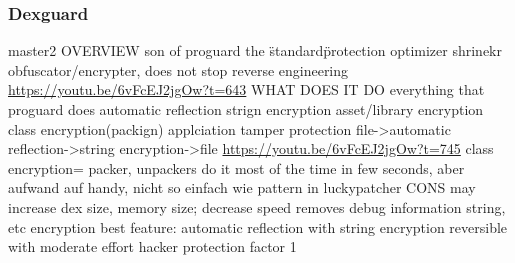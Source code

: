 \subsubsection{Dexguard}\label{subsubsection:counter-reengineering-optobf-dexguard}
master2\newline
OVERVIEW\newline
son of proguard\newline
the \"standard\" protection\newline
optimizer\newline
shrinekr\newline
obfuscator/encrypter, does not stop reverse engineering\newline
\url{https://youtu.be/6vFcEJ2jgOw?t=643}\newline
WHAT DOES IT DO\newline
everything that proguard does\newline
automatic reflection\newline
strign encryption\newline
asset/library encryption\newline
class encryption(packign)\newline
applciation tamper protection\newline
file->automatic reflection->string encryption->file\newline
\url{https://youtu.be/6vFcEJ2jgOw?t=745}\newline
class encryption= packer, unpackers do it most of the time in few seconds, aber aufwand auf handy, nicht so einfach wie pattern in luckypatcher\newline
CONS\newline
may increase dex size, memory size; decrease speed\newline
removes debug information\newline
string, etc encryption\newline
best feature: automatic reflection with string encryption\newline
reversible with moderate effort\newline
hacker protection factor 1\newline

